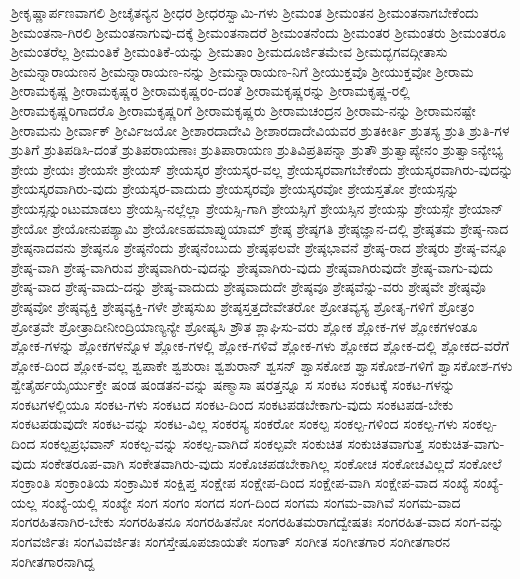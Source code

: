 {ಶ್ರೀಕೃಷ್ಣಾರ್ಪಣವಾಗಲಿ
ಶ್ರೀಚೈತನ್ಯನ
ಶ್ರೀಧರ
ಶ್ರೀಧರಸ್ವಾಮಿ-ಗಳು
ಶ್ರೀಮಂತ
ಶ್ರೀಮಂತನ
ಶ್ರೀಮಂತನಾಗಬೇಕೆಂದು
ಶ್ರೀಮಂತನಾ-ಗಿರಲಿ
ಶ್ರೀಮಂತನಾಗುವು-ದಕ್ಕೆ
ಶ್ರೀಮಂತನಾದರೆ
ಶ್ರೀಮಂತನೆಂದು
ಶ್ರೀಮಂತರ
ಶ್ರೀಮಂತರು
ಶ್ರೀಮಂತರೂ
ಶ್ರೀಮಂತರೆಲ್ಲ
ಶ್ರೀಮಂತಿಕೆ
ಶ್ರೀಮಂತಿಕೆ-ಯನ್ನು
ಶ್ರೀಮತಾಂ
ಶ್ರೀಮದೂರ್ಜಿತಮೇವ
ಶ್ರೀಮದ್ಭಗವದ್ಗೀತಾಸು
ಶ್ರೀಮನ್ನಾರಾಯಣನ
ಶ್ರೀಮನ್ನಾರಾಯಣ-ನನ್ನು
ಶ್ರೀಮನ್ನಾರಾಯಣ-ನಿಗೆ
ಶ್ರೀಯುಕ್ತವೊ
ಶ್ರೀಯುಕ್ತವೋ
ಶ್ರೀರಾಮ
ಶ್ರೀರಾಮಕೃಷ್ಣ
ಶ್ರೀರಾಮಕೃಷ್ಣರ
ಶ್ರೀರಾಮಕೃಷ್ಣರಂ-ದಂತೆ
ಶ್ರೀರಾಮಕೃಷ್ಣರನ್ನು
ಶ್ರೀರಾಮಕೃಷ್ಣ-ರಲ್ಲಿ
ಶ್ರೀರಾಮಕೃಷ್ಣರಿಗಾದರೊ
ಶ್ರೀರಾಮಕೃಷ್ಣರಿಗೆ
ಶ್ರೀರಾಮಕೃಷ್ಣರು
ಶ್ರೀರಾಮಚಂದ್ರನ
ಶ್ರೀರಾಮ-ನನ್ನು
ಶ್ರೀರಾಮನಷ್ಟೇ
ಶ್ರೀರಾಮನು
ಶ್ರೀರ್ವಾಕ್
ಶ್ರೀರ್ವಿಜಯೋ
ಶ್ರೀಶಾರದಾದೇವಿ
ಶ್ರೀಶಾರದಾದೇವಿಯವರ
ಶ್ರುತಕೀರ್ತಿ
ಶ್ರುತಸ್ಯ
ಶ್ರುತಿ
ಶ್ರುತಿ-ಗಳ
ಶ್ರುತಿಗೆ
ಶ್ರುತಿಪಡಿಸಿ-ದಂತೆ
ಶ್ರುತಿಪರಾಯಣಾಃ
ಶ್ರುತಿಪಾರಾಯಣ
ಶ್ರುತಿವಿಪ್ರತಿಪನ್ನಾ
ಶ್ರುತೌ
ಶ್ರುತ್ವಾಪ್ಯೇನಂ
ಶ್ರುತ್ವಾಽನ್ಯೇಭ್ಯ
ಶ್ರೇಯ
ಶ್ರೇಯಃ
ಶ್ರೇಯಸೇ
ಶ್ರೇಯಸ್
ಶ್ರೇಯಸ್ಕರ
ಶ್ರೇಯಸ್ಕರ-ವಲ್ಲ
ಶ್ರೇಯಸ್ಕರವಾಗಬೇಕೆಂದು
ಶ್ರೇಯಸ್ಕರವಾಗಿರು-ವುದನ್ನು
ಶ್ರೇಯಸ್ಕರವಾಗಿರು-ವುದು
ಶ್ರೇಯಸ್ಕರ-ವಾದುದು
ಶ್ರೇಯಸ್ಕರವೊ
ಶ್ರೇಯಸ್ಕರವೋ
ಶ್ರೇಯಸ್ತತೋ
ಶ್ರೇಯಸ್ಸನ್ನು
ಶ್ರೇಯಸ್ಸನ್ನುಂಟುಮಾಡಲು
ಶ್ರೇಯಸ್ಸಿ-ನಲ್ಲೆಲ್ಲಾ
ಶ್ರೇಯಸ್ಸಿ-ಗಾಗಿ
ಶ್ರೇಯಸ್ಸಿಗೆ
ಶ್ರೇಯಸ್ಸಿನ
ಶ್ರೇಯಸ್ಸು
ಶ್ರೇಯಸ್ಸೇ
ಶ್ರೇಯಾನ್
ಶ್ರೇಯೋ
ಶ್ರೇಯೋನುಪಶ್ಯಾಮಿ
ಶ್ರೇಯೋಽಹಮಾಪ್ನುಯಾಮ್
ಶ್ರೇಷ್ಠ
ಶ್ರೇಷ್ಠಗತಿ
ಶ್ರೇಷ್ಠಜ್ಞಾನ-ದಲ್ಲಿ
ಶ್ರೇಷ್ಠತಮ
ಶ್ರೇಷ್ಠ-ನಾದ
ಶ್ರೇಷ್ಠನಾದವನು
ಶ್ರೇಷ್ಠನೂ
ಶ್ರೇಷ್ಠನೆಂದು
ಶ್ರೇಷ್ಠನೆಂಬುದು
ಶ್ರೇಷ್ಠಫಲವೇ
ಶ್ರೇಷ್ಠಭಾವನೆ
ಶ್ರೇಷ್ಠ-ರಾದ
ಶ್ರೇಷ್ಠರು
ಶ್ರೇಷ್ಠ-ವನ್ನೂ
ಶ್ರೇಷ್ಠ-ವಾಗಿ
ಶ್ರೇಷ್ಠ-ವಾಗಿರುವ
ಶ್ರೇಷ್ಠವಾಗಿರು-ವುದನ್ನು
ಶ್ರೇಷ್ಠವಾಗಿರು-ವುದು
ಶ್ರೇಷ್ಠವಾಗಿರುವುದೇ
ಶ್ರೇಷ್ಠ-ವಾಗು-ವುದು
ಶ್ರೇಷ್ಠ-ವಾದ
ಶ್ರೇಷ್ಠ-ವಾದು-ದನ್ನು
ಶ್ರೇಷ್ಠ-ವಾದುದು
ಶ್ರೇಷ್ಠವಾದುದೇ
ಶ್ರೇಷ್ಠವೂ
ಶ್ರೇಷ್ಠವೆನ್ನು-ವರು
ಶ್ರೇಷ್ಠವೇ
ಶ್ರೇಷ್ಠವೊ
ಶ್ರೇಷ್ಠವೋ
ಶ್ರೇಷ್ಠವ್ಯಕ್ತಿ
ಶ್ರೇಷ್ಠವ್ಯಕ್ತಿ-ಗಳೇ
ಶ್ರೇಷ್ಠಸುಖ
ಶ್ರೇಷ್ಠಸ್ತತ್ತದೇವೇತರೋ
ಶ್ರೋತವ್ಯಸ್ಯ
ಶ್ರೋತೃ-ಗಳಿಗೆ
ಶ್ರೋತ್ರಂ
ಶ್ರೋತ್ರವೇ
ಶ್ರೋತ್ರಾದೀನೀಂದ್ರಿಯಾಣ್ಯನ್ಯೇ
ಶ್ರೋಷ್ಯಸಿ
ಶ್ರೌತ
ಶ್ಲಾಘಿಸು-ವರು
ಶ್ಲೋಕ
ಶ್ಲೋಕ-ಗಳ
ಶ್ಲೋಕಗಳಂತೂ
ಶ್ಲೋಕ-ಗಳನ್ನು
ಶ್ಲೋಕಗಳನ್ನೊಳ
ಶ್ಲೋಕ-ಗಳಲ್ಲಿ
ಶ್ಲೋಕ-ಗಳಿವೆ
ಶ್ಲೋಕ-ಗಳು
ಶ್ಲೋಕದ
ಶ್ಲೋಕ-ದಲ್ಲಿ
ಶ್ಲೋಕದ-ವರೆಗೆ
ಶ್ಲೋಕ-ದಿಂದ
ಶ್ಲೋಕ-ವಲ್ಲ
ಶ್ವಪಾಕೇ
ಶ್ವಶುರಾಃ
ಶ್ವಶುರಾನ್
ಶ್ವಸನ್
ಶ್ವಾಸಕೋಶ
ಶ್ವಾಸಕೋಶ-ಗಳಿಗೆ
ಶ್ವಾಸಕೋಶ-ಗಳು
ಶ್ವೇತೈರ್ಹಯೈರ್ಯುಕ್ತೇ
ಷಂಡ
ಷಂಡತನ-ವನ್ನು
ಷಣ್ಮಾಸಾ
ಷರತ್ತನ್ನೂ
ಸ
ಸಂಕಟ
ಸಂಕಟಕ್ಕೆ
ಸಂಕಟ-ಗಳನ್ನು
ಸಂಕಟಗಳಲ್ಲಿಯೂ
ಸಂಕಟ-ಗಳು
ಸಂಕಟದ
ಸಂಕಟ-ದಿಂದ
ಸಂಕಟಪಡಬೇಕಾಗು-ವುದು
ಸಂಕಟಪಡ-ಬೇಕು
ಸಂಕಟಪಡುವುದೇ
ಸಂಕಟ-ವನ್ನು
ಸಂಕಟ-ವಿಲ್ಲ
ಸಂಕರಸ್ಯ
ಸಂಕರೋ
ಸಂಕಲ್ಪ
ಸಂಕಲ್ಪ-ಗಳಿಂದ
ಸಂಕಲ್ಪ-ಗಳು
ಸಂಕಲ್ಪ-ದಿಂದ
ಸಂಕಲ್ಪಪ್ರಭವಾನ್
ಸಂಕಲ್ಪ-ವನ್ನು
ಸಂಕಲ್ಪ-ವಾಗಿದೆ
ಸಂಕಲ್ಪವೇ
ಸಂಕುಚಿತ
ಸಂಕುಚಿತವಾಗುತ್ತ
ಸಂಕುಚಿತ-ವಾಗು-ವುದು
ಸಂಕೇತರೂಪ-ವಾಗಿ
ಸಂಕೇತವಾಗಿರು-ವುದು
ಸಂಕೊಚಪಡಬೇಕಾಗಿಲ್ಲ
ಸಂಕೋಚ
ಸಂಕೋಚವಿಲ್ಲದೆ
ಸಂಕೋಲೆ
ಸಂಕ್ರಾಂತಿ
ಸಂಕ್ರಾಂತಿಯ
ಸಂಕ್ರಾಮಿಕ
ಸಂಕ್ಷಿಪ್ತ
ಸಂಕ್ಷೇಪ
ಸಂಕ್ಷೇಪ-ದಿಂದ
ಸಂಕ್ಷೇಪ-ವಾಗಿ
ಸಂಕ್ಷೇಪ-ವಾದ
ಸಂಖ್ಯೆ
ಸಂಖ್ಯೆ-ಯಲ್ಲ
ಸಂಖ್ಯೆ-ಯಲ್ಲಿ
ಸಂಖ್ಯೇ
ಸಂಗ
ಸಂಗಂ
ಸಂಗದ
ಸಂಗ-ದಿಂದ
ಸಂಗಮ
ಸಂಗಮ-ವಾಗಿವೆ
ಸಂಗಮ-ವಾದ
ಸಂಗರಹಿತನಾಗಿರ-ಬೇಕು
ಸಂಗರಹಿತನೂ
ಸಂಗರಹಿತನೋ
ಸಂಗರಹಿತಮರಾಗದ್ವೇಷತಃ
ಸಂಗರಹಿತ-ವಾದ
ಸಂಗ-ವನ್ನು
ಸಂಗವರ್ಜಿತಃ
ಸಂಗವಿವರ್ಜಿತಃ
ಸಂಗಸ್ತೇಷೂಪಜಾಯತೇ
ಸಂಗಾತ್
ಸಂಗೀತ
ಸಂಗೀತಗಾರ
ಸಂಗೀತಗಾರನ
ಸಂಗೀತಗಾರನಾಗಿದ್ದ
}
